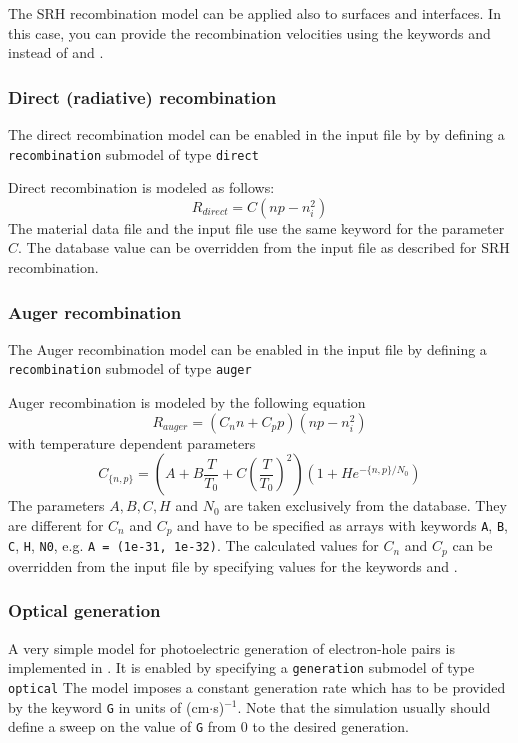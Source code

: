 The SRH recombination model can be applied also to surfaces and interfaces.
In this case, you can provide the recombination velocities using the keywords  and  instead of
 and .


\subsubsection{Direct (radiative) recombination}
The direct recombination model can be enabled in the input file by by defining a \texttt{recombination} submodel of type \texttt{direct}

Direct recombination is modeled as follows:
\begin{equation}
R_{direct} = C(np - n_i^2)
\end{equation}
The material data file and the input file use the same keyword  for the parameter $C$.
The database value can be overridden from the input file as described for SRH recombination.




\subsubsection{Auger recombination}
The Auger recombination model can be enabled in the input file by defining a \texttt{recombination} submodel of type \texttt{auger}

Auger recombination is modeled by the following equation
\begin{equation}
R_{auger} = (C_nn + C_pp)(np - n_i^2)
\end{equation}
with temperature dependent parameters
\[
C_{\{n,p\}}  =  \left(A + B\frac{T}{T_0} + C\left(\frac{T}{T_0}\right)^2\right)\left(1 + H e^{-\{n,p\}/N_0}\right)
\]
The parameters $A, B, C, H$ and $N_0$ are taken exclusively from the database.
They are different for $C_n$ and $C_p$ and have to be specified as arrays with keywords \verb+A+, \verb+B+, \verb+C+, \verb+H+, \verb+N0+, e.g. \verb+A = (1e-31, 1e-32)+.
The calculated values for $C_n$ and $C_p$ can be overridden from the input file by specifying values for the keywords  and .


\subsubsection{Optical generation}
A very simple model for photoelectric generation of electron-hole pairs is implemented in \TiberCAD{}.
It is enabled by specifying a \texttt{generation} submodel of type \texttt{optical}
The model imposes a constant generation rate which has to be provided by the keyword \verb+G+ in units of (cm$\cdot$s)$^{-1}$.
Note that the simulation usually should define a sweep on the value of \verb+G+ from 0 to the desired generation.



